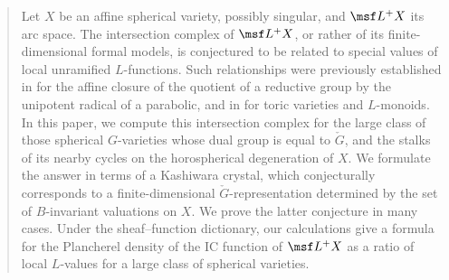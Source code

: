 \begin{abstract}
%
Let $X$ be an affine spherical variety, possibly singular, and $\msf L^+X$ its arc space. The intersection complex of $\msf L^+X$, or rather of its finite-dimensional formal models, is conjectured to be related to special values of local unramified $L$-functions. Such relationships were previously established in \cite{BFGM} for the affine closure of the quotient of a reductive group by the unipotent radical of a parabolic, and in \cite{BNS} for toric varieties and $L$-monoids. In this paper, we compute this intersection complex for the large class of those spherical $G$-varieties whose dual group is equal to $\check G$, and the stalks of its nearby cycles on the horospherical degeneration of $X$. We formulate the answer in terms of a Kashiwara crystal, which conjecturally corresponds to a finite-dimensional $\check G$-representation determined by the set of $B$-invariant valuations on $X$.
We prove the latter conjecture in many cases. Under the sheaf--function dictionary,
our calculations give a formula for the Plancherel density of the IC function
of $\msf L^+X$ as a ratio of local $L$-values for a large class of spherical varieties.
\end{abstract}
